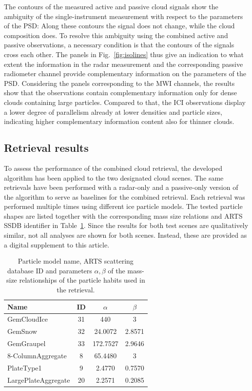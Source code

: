 \documentclass[journal abbreviation, manuscript]{copernicus}
\begin{document}
The contours of the measured active and passive cloud signals show the ambiguity
of the single-instrument measurement with respect to the parameters of the PSD:
Along these contours the signal does not change, while the cloud composition
does. To resolve this ambiguity using the combined active and passive
observations, a necessary condition is that the contours of the signals cross
each other. The panels in Fig.~\ref{fig:isolines} thus give an indication to
what extent the information in the radar measurement and the corresponding
passive radiometer channel provide complementary information on the parameters
of the PSD. Considering the panels corresponding to the MWI channels, the
results show that the observations contain complementary information only for
dense clouds containing large particles. Compared to that, the ICI observations
display a lower degree of parallelism already at lower densities and particle
sizes, indicating higher complementary information content also for thinner
clouds.

\subsection{Retrieval results}

To assess the performance of the combined cloud retrieval, the developed
algorithm has been applied to the two designated cloud scenes. The same
retrievals have been performed with a radar-only and a passive-only version of
the algorithm to serve as baselines for the combined retrieval. Each retrieval
was performed multiple times using different ice particle models. The tested
particle shapes are listed together with the corresponding mass size relations
and ARTS SSDB identifier in Table~\ref{tab:particles_retrieval}. Since the
results for both test scenes are qualitatively similar, not all analyses are
shown for both scenes. Instead, these are provided as a digital supplement to
this article.

\begin{table}
  \centering
  \caption{Particle model name, ARTS scattering database ID and parameters
    $\alpha, \beta$ of the mass-size relationships of the particle habits used
    in the retrieval.}
  \begin{tabular}{l|c|c|c}
    Name & ID & $\alpha$ & $\beta$ \\
    \hline
    GemCloudIce         & 31  & 440      & 3 \\
    GemSnow             & 32  & 24.0072  & 2.8571 \\
    GemGraupel          & 33  & 172.7527 & 2.9646 \\
    8-ColumnAggregate   &  8  & 65.4480  & 3      \\
    PlateType1          &  9  & 2.4770   & 0.7570 \\
    LargePlateAggregate &  20 & 2.2571   & 0.2085 \\
  \end{tabular}
  \label{tab:particles_retrieval}
\end{table}
\end{document}

